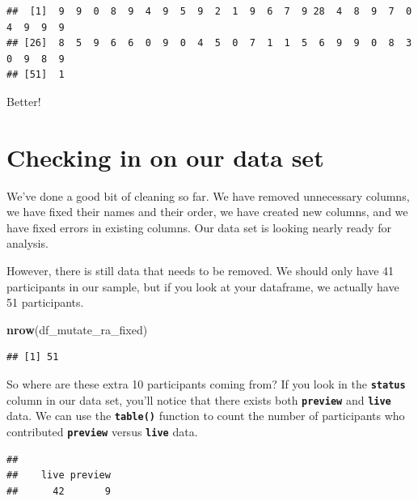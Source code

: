 \documentclass[
]{book}
\newenvironment{Shaded}{\begin{snugshade}}{\end{snugshade}}
\newcommand{\FunctionTok}[1]{\textcolor[rgb]{0.13,0.29,0.53}{\textbf{#1}}}
\newcommand{\NormalTok}[1]{#1}
\newcommand{\SpecialCharTok}[1]{\textcolor[rgb]{0.81,0.36,0.00}{\textbf{#1}}}
\begin{document}
\begin{verbatim}
##  [1]  9  9  0  8  9  4  9  5  9  2  1  9  6  7  9 28  4  8  9  7  0  4  9  9  9
## [26]  8  5  9  6  6  0  9  0  4  5  0  7  1  1  5  6  9  9  0  8  3  0  9  8  9
## [51]  1
\end{verbatim}

Better!

\hypertarget{checking-in-on-our-data-set}{%
\section{Checking in on our data set}\label{checking-in-on-our-data-set}}

We've done a good bit of cleaning so far. We have removed unnecessary columns, we have fixed their names and their order, we have created new columns, and we have fixed errors in existing columns. Our data set is looking nearly ready for analysis.

However, there is still data that needs to be removed. We should only have 41 participants in our sample, but if you look at your dataframe, we actually have 51 participants.

\begin{Shaded}
\begin{Highlighting}[]
\FunctionTok{nrow}\NormalTok{(df\_mutate\_ra\_fixed)}
\end{Highlighting}
\end{Shaded}

\begin{verbatim}
## [1] 51
\end{verbatim}

So where are these extra 10 participants coming from? If you look in the \textbf{\texttt{status}} column in our data set, you'll notice that there exists both \textbf{\texttt{preview}} and \textbf{\texttt{live}} data. We can use the \textbf{\texttt{table()}} function to count the number of participants who contributed \textbf{\texttt{preview}} versus \textbf{\texttt{live}} data.

\begin{Shaded}
\end{Shaded}

\begin{verbatim}
## 
##    live preview 
##      42       9
\end{verbatim}
\end{document}
